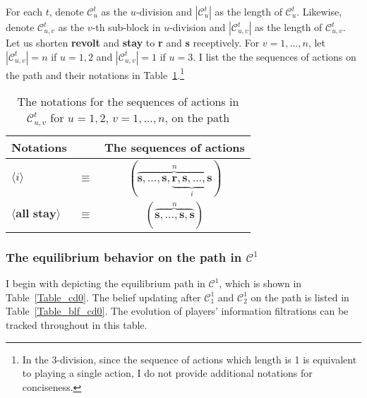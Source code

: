 \documentclass[12pt,letter]{article}
\newcommand{\Kappa}{\mathcal{C}}
\theoremstyle{definition}
\theoremstyle{remark}
\theoremstyle{claim}
\begin{document}
For each $t$, denote $\Kappa^t_{u}$ as the $u$-division and $|\Kappa^t_{u} |$ as the length of $\Kappa^t_{u}$. Likewise, denote $\Kappa^t_{u,v}$ as the $v$-th sub-block in $u$-division and $|\Kappa^t_{u,v} |$ as the length of $\Kappa^t_{u,v}$. Let us shorten \textbf{revolt} and \textbf{stay} to \textbf{r} and \textbf{s} receptively. For $v=1,...,n$, let $|\Kappa^t_{u,v}|=n$ if $u=1,2$ and $|\Kappa^t_{u,v}|=1$ if $u=3$. I list the the sequences of actions on the path and their notations in Table~\ref{Table_msg_coordination}.\footnote{In the $3$-division, since the sequence of actions which length is 1 is equivalent to playing a single action, I do not provide additional notations for conciseness.}



\begin{table}[!htbp]
\caption{The notations for the sequences of actions in $\Kappa^t_{u,v}$ for $u=1,2$, $v=1,...,n$, on the path}
\label{Table_msg_coordination}
\begin{center}
\begin{tabular}{l c c}
Notations & &The sequences of actions \\
\hline
\hline
$\langle i \rangle$ 				& $\equiv$ 			& $(\overbrace{ \textbf{s},...,\textbf{s},\underbrace{\textbf{r},\textbf{s},...,\textbf{s}}_{i}}^{n} )$  \\
$\langle \textbf{all stay} \rangle$	 					& $\equiv$ 			& $( \overbrace{\textbf{s},...,\textbf{s},{\textbf{s}}}^{n} )$  \\
\hline
\end{tabular}
\end{center}
\end{table}


\subsubsection{The equilibrium behavior on the path in $\Kappa^1$}
I begin with depicting the equilibrium path in $\Kappa^1$, which is shown in Table~\ref{Table_cd0}. The belief updating after $\Kappa^1_1$ and $\Kappa^1_2$ on the path is listed in Table~\ref{Table_blf_cd0}. The evolution of players' information filtrations can be tracked throughout in this table.
\end{document}
